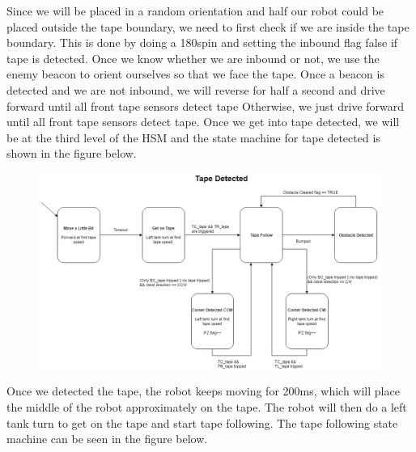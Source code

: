 \documentclass{article}
\begin{document}
Since we will be placed in a random orientation and half our robot could be placed outside the tape boundary, we need to first check if we are inside the tape boundary.  This is done by doing a 180\degree spin and setting the inbound flag false if tape is detected.  Once we know whether we are inbound or not, we use the enemy beacon to orient ourselves so that we face the tape.  Once a beacon is detected and we are not inbound, we will reverse for half a second and drive forward until all front tape sensors detect tape  Otherwise, we just drive forward until all front tape sensors detect tape.  Once we get into tape detected, we will be at the third level of the HSM and the state machine for tape detected is shown in the figure below.

\begin{figure}[H]
    \centering
    \includegraphics[scale = 0.45]{TapeDetected.png}
\end{figure}

Once we detected the tape, the robot keeps moving for 200ms, which will place the middle of the robot approximately on the tape.  The robot will then do a left tank turn to get on the tape and start tape following.  The tape following state machine can be seen in the figure below.  
\end{document}
